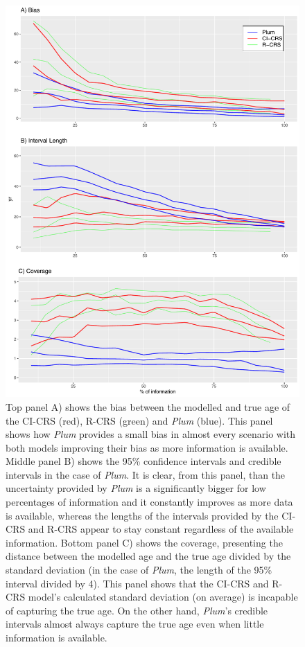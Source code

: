 \documentclass [10pt] {article}
\begin{document}
\begin{figure}[!]
 \centering
  \includegraphics[width=.75\linewidth]{AccPrec.pdf}
	\caption{Top panel A) shows the bias between the modelled and true age of the CI-CRS (red), R-CRS (green) and \textit{Plum} (blue). This panel shows how \textit{Plum} provides a small bias in almost every scenario with both models improving their bias as more information is available. Middle panel B) shows the 95\% confidence intervals and credible intervals in the case of \textit{Plum}. It is clear, from this panel, than the uncertainty provided by \textit{Plum} is a significantly bigger for low percentages of information and it constantly improves as more data is available, whereas the lengths of the intervals provided by the CI-CRS and R-CRS appear to stay constant regardless of the available information. Bottom panel C) shows the coverage, presenting the distance between the modelled age and the true age divided by the standard deviation (in the case of \textit{Plum}, the length of the 95\% interval divided by 4). This panel shows that the CI-CRS and R-CRS model's calculated standard deviation (on average) is incapable of capturing the true age. On the other hand, \textit{Plum}'s credible intervals almost always capture the true age even when little information is available.}
  \label{fig:accpre}
\end{figure}
\end{document}
